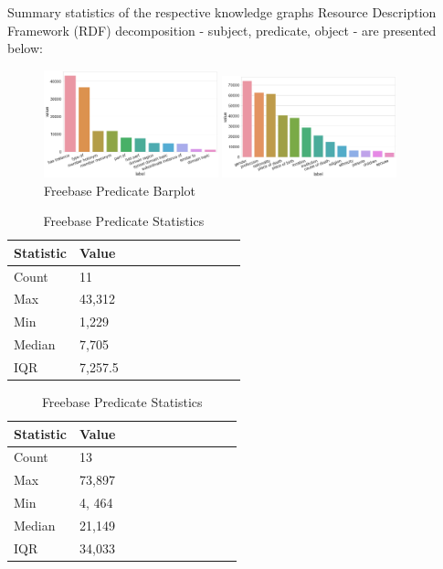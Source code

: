 Summary statistics of the respective knowledge graphs Resource Description Framework (RDF) decomposition - subject, predicate, object - are presented below:


\begin{figure}[H]
	\parbox{.5\linewidth}{
   		\caption{Wordnet Predicate Barplot}
   		\centering
    		\includegraphics[width=0.45\textwidth, height=0.2\textheight]{Wordnet_Predicate_Counts}
		}
	\hfill
	\parbox{.5\linewidth}{
		\caption{Freebase Predicate Barplot}
   		\centering
		\includegraphics[width=0.45\textwidth, height=0.2\textheight]{Freebase_Predicate_Counts}
		}
\end{figure}

\begin{table}[H]
	\parbox{.5\linewidth}{
		\caption{Wordnet Predicate Statistics}
		\centering
		\begin{tabular}{lllllllllll}
  			\textbf{Statistic} & \textbf{Value}  \\
  			\hline
			Count & 11 \\
			Max & 43,312  \\
			Min & 1,229  \\
  			Median & 7,705  \\
  			IQR & 7,257.5  \\
		\end{tabular}
		}
	\hfill
	\parbox{.5\linewidth}{
		\caption{Freebase Predicate Statistics}
		\centering
		\begin{tabular}{lllllllllll}
  			\textbf{Statistic} & \textbf{Value}  \\
  			\hline
			Count & 13 \\
			Max & 73,897  \\
			Min & 4, 464  \\
  			Median & 21,149  \\
  			IQR & 34,033  \\
		\end{tabular}
		}
\end{table}

